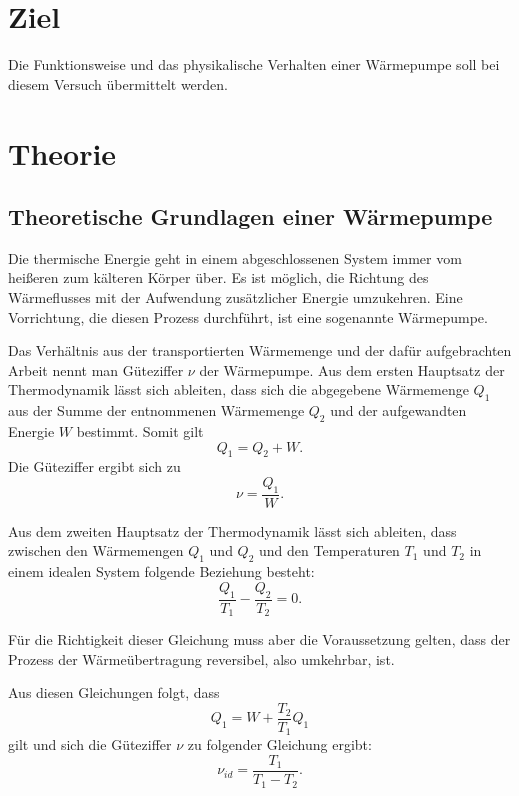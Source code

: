 \section{Ziel}
\label{sec:Ziel}

Die Funktionsweise und das physikalische Verhalten einer Wärmepumpe soll bei diesem 
Versuch übermittelt werden.

\section{Theorie}
\label{sec:Theorie}

\subsection{Theoretische Grundlagen einer Wärmepumpe}
Die thermische Energie geht in einem abgeschlossenen System immer vom heißeren zum 
kälteren Körper über. Es ist möglich, die Richtung des Wärmeflusses mit der Aufwendung 
zusätzlicher Energie umzukehren. Eine Vorrichtung, die diesen Prozess durchführt, ist 
eine sogenannte Wärmepumpe. 

\noindent Das Verhältnis aus der transportierten Wärmemenge und der dafür aufgebrachten 
Arbeit nennt man Güteziffer $\nu$ der Wärmepumpe. Aus dem ersten Hauptsatz der 
Thermodynamik lässt sich ableiten, dass sich die abgegebene Wärmemenge $Q_1$ aus der 
Summe der entnommenen Wärmemenge $Q_2$ und der aufgewandten Energie $W$ bestimmt. 
Somit gilt
\begin{equation*}
    Q_1 = Q_2 + W.
\end{equation*} 
Die Güteziffer ergibt sich zu 
\begin{equation*}
    \nu = \frac{Q_1}{W}.
\end{equation*}

\noindent Aus dem zweiten Hauptsatz der Thermodynamik lässt sich ableiten, dass zwischen den Wärmemengen 
$Q_1$ und $Q_2$ und den Temperaturen $T_1$ und $T_2$ in einem idealen System folgende 
Beziehung besteht:
\begin{equation*}
    \frac{Q_1}{T_1} - \frac{Q_2}{T_2} = 0.
\end{equation*}

\noindent Für die Richtigkeit dieser Gleichung muss aber die Voraussetzung gelten, dass der 
Prozess der Wärmeübertragung reversibel, also umkehrbar, ist. 

\noindent Aus diesen Gleichungen folgt, dass 
\begin{equation*}
    Q_1 = W+ \frac{T_2}{T_1} Q_1 
\end{equation*}
gilt und sich die Güteziffer $\nu$ zu folgender Gleichung ergibt: 
\begin{equation}
    \nu_{id}= \frac{T_1}{T_1-T_2}.
    \label{eqn:ideal}
\end{equation} 

